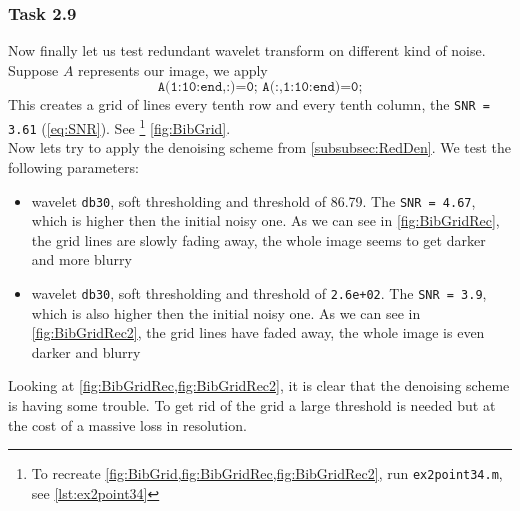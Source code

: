 \documentclass[a4paper]{article}
\begin{document}
    \subsubsection{Task 2.9} \label{subsubsec:Grid}

	Now finally let us test redundant wavelet transform on different kind of noise. Suppose $A$ represents our image, we apply
	\begin{equation*}
		\texttt{A(1:10:end,:)=0; A(:,1:10:end)=0;}
	\end{equation*}
	This creates a grid of lines every tenth row and every tenth column, the \texttt{SNR = 3.61} (\cref{eq:SNR}). See \footnote{To recreate \cref{fig:BibGrid,fig:BibGridRec,fig:BibGridRec2}, run \texttt{ex2point34.m}, see \cref{lst:ex2point34}} \cref{fig:BibGrid}.\\
	
	Now lets try to apply the denoising scheme from \cref{subsubsec:RedDen}. We test the following parameters: 
	\begin{itemize}
		\item wavelet \texttt{db30}, soft thresholding and threshold of 86.79. The \texttt{SNR = 4.67}, which is higher then the initial noisy one. As we can see in \cref{fig:BibGridRec}, the grid lines are slowly fading away, the whole image seems to get darker and more blurry
		\item wavelet \texttt{db30}, soft thresholding and threshold of \texttt{2.6e+02}. The \texttt{SNR = 3.9}, which is also higher then the initial noisy one. As we can see in \cref{fig:BibGridRec2}, the grid lines have faded away, the whole image is even darker and blurry 
	\end{itemize}

	Looking at \cref{fig:BibGridRec,fig:BibGridRec2}, it is clear that the denoising scheme is having some trouble. To get rid of the grid a large threshold is needed but at the cost of a massive loss in resolution. 
\end{document}
